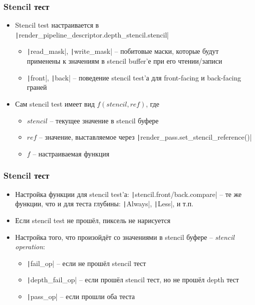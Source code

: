 \documentclass[10pt]{beamer}
\begin{document}
\begin{frame}[fragile]
\frametitle{Stencil тест}
\begin{itemize}
\item Stencil test настраивается в \texttt|render_pipeline_descriptor.depth_stencil.stencil|
\pause
\begin{itemize}
\item \texttt|read_mask|, \texttt|write_mask| -- побитовые маски, которые будут применены к значениям в stencil buffer'е при его чтении/записи
\pause
\item \texttt|front|, \texttt|back| -- поведение stencil test'а для front-facing и back-facing граней
\end{itemize}
\pause
\item Сам stencil test имеет вид \(f(stencil, ref)\), где
\begin{itemize}
\item \(stencil\) -- текущее значение в stencil буфере
\pause
\item \(ref\) -- значение, выставляемое через \texttt|render_pass.set_stencil_reference()|
\pause
\item \(f\) -- настраиваемая функция
\end{itemize}
\end{itemize}
\end{frame}

\begin{frame}[fragile]
\frametitle{Stencil тест}
\begin{itemize}
\item Настройка функции для stencil test'а: \texttt|stencil.{front/back}.compare| -- те же функции, что и для теста глубины: \texttt|Always|, \texttt|Less|, и т.п.
\pause
\item Если stencil test не прошёл, пиксель не нарисуется
\pause
\item Настройка того, что произойдёт со значениями в stencil буфере -- \textit{stencil operation}:
\begin{itemize}
\item \texttt|fail_op| -- если не прошёл stencil тест
\item \texttt|depth_fail_op| -- если прошёл stencil тест, но не прошёл depth тест
\item \texttt|pass_op| -- если прошли оба теста
\end{itemize}
\end{itemize}
\end{frame}
\end{document}
